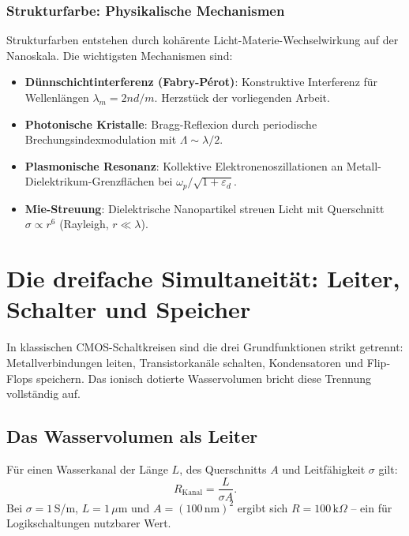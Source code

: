 ﻿\documentclass[a4paper,12pt]{scrreprt}
\theoremstyle{definition}
\begin{document}
\subsubsection{Strukturfarbe: Physikalische Mechanismen}

Strukturfarben entstehen durch kohärente Licht-Materie-Wechselwirkung auf
der Nanoskala. Die wichtigsten Mechanismen sind:
\begin{itemize}
  \item \textbf{Dünnschichtinterferenz (Fabry-Pérot)}: Konstruktive Interferenz
    für Wellenlängen $\lambda_m = 2nd/m$. Herzstück der vorliegenden Arbeit.
  \item \textbf{Photonische Kristalle}: Bragg-Reflexion durch periodische
    Brechungsindexmodulation mit $\Lambda \sim \lambda/2$.
  \item \textbf{Plasmonische Resonanz}: Kollektive Elektronenoszillationen an
    Metall-Dielektrikum-Grenzflächen bei $\omega_p/\sqrt{1 + \varepsilon_d}$.
  \item \textbf{Mie-Streuung}: Dielektrische Nanopartikel streuen Licht mit
    Querschnitt $\sigma \propto r^6$ (Rayleigh, $r \ll \lambda$).
\end{itemize}

\section{Die dreifache Simultaneität: Leiter, Schalter und Speicher}

In klassischen CMOS-Schaltkreisen sind die drei Grundfunktionen strikt getrennt:
Metallverbindungen leiten, Transistorkanäle schalten, Kondensatoren und
Flip-Flops speichern. Das ionisch dotierte Wasservolumen bricht diese Trennung
vollständig auf.

\subsection{Das Wasservolumen als Leiter}

Für einen Wasserkanal der Länge $L$, des Querschnitts $A$ und Leitfähigkeit
$\sigma$ gilt:
\begin{equation}
  R_{\mathrm{Kanal}} = \frac{L}{\sigma A}.
\end{equation}
Bei $\sigma = 1$\,S/m, $L = 1\,\mu$m und $A = (100\,\text{nm})^2$ ergibt
sich $R = 100\,\text{k}\Omega$ -- ein für Logikschaltungen nutzbarer Wert.
\end{document}
